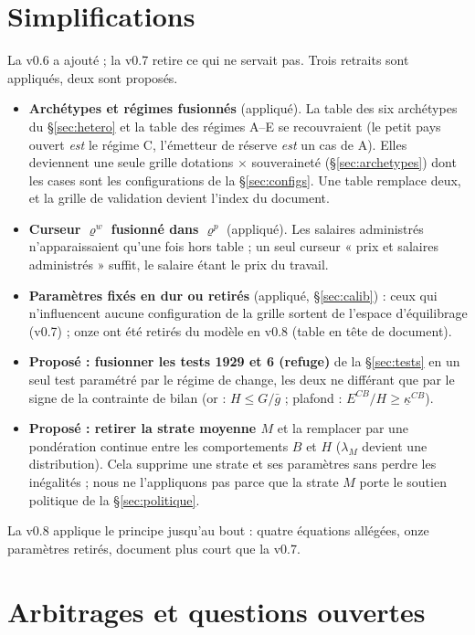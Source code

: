 \documentclass[11pt,a4paper]{article}
\newcommand{\og}{« }
\newcommand{\fg}{ »}
\begin{document}
\section{Simplifications}
\label{sec:simplif}
La v0.6 a ajouté ; la v0.7 retire ce qui ne servait pas. Trois retraits sont appliqués, deux sont proposés.
\begin{itemize}
\item \textbf{Archétypes et régimes fusionnés} (appliqué). La table des six archétypes du \S\ref{sec:hetero} et la table des régimes A--E se recouvraient (le petit pays ouvert \emph{est} le régime C, l'émetteur de réserve \emph{est} un cas de A). Elles deviennent une seule grille dotations $\times$ souveraineté (\S\ref{sec:archetypes}) dont les cases sont les configurations de la \S\ref{sec:configs}. Une table remplace deux, et la grille de validation devient l'index du document.
\item \textbf{Curseur $\varrho^w$ fusionné dans $\varrho^p$} (appliqué). Les salaires administrés n'apparaissaient qu'une fois hors table ; un seul curseur \og prix et salaires administrés\fg{} suffit, le salaire étant le prix du travail.
\item \textbf{Paramètres fixés en dur ou retirés} (appliqué, \S\ref{sec:calib}) : ceux qui n'influencent aucune configuration de la grille sortent de l'espace d'équilibrage (v0.7) ; onze ont été retirés du modèle en v0.8 (table en tête de document).
\item \textbf{Proposé : fusionner les tests 1929 et 6 (refuge)} de la \S\ref{sec:tests} en un seul test paramétré par le régime de change, les deux ne différant que par le signe de la contrainte de bilan (or : $H\le G/\bar g$ ; plafond : $E^{CB}/H\ge\underline\kappa^{CB}$).
\item \textbf{Proposé : retirer la strate moyenne $M$} et la remplacer par une pondération continue entre les comportements $B$ et $H$ ($\lambda_M$ devient une distribution). Cela supprime une strate et ses paramètres sans perdre les inégalités ; nous ne l'appliquons pas parce que la strate $M$ porte le soutien politique de la \S\ref{sec:politique}.
\end{itemize}
La v0.8 applique le principe jusqu'au bout : quatre équations allégées, onze paramètres retirés, document plus court que la v0.7.

\section{Arbitrages et questions ouvertes}
\label{sec:arbitrages}
\end{document}
